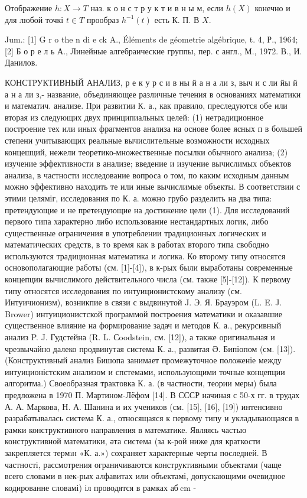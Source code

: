 \documentclass[10pt]{article}
\begin{document}
Отображение $h: X \rightarrow T$ наз. к о н с т р у к т и в н ы м, если $h(X)$ конечно и для любой точкі $t \in T$ прообраз $h^{-1}(t)$ есть К. П. В $X$.



Jum.: [1] G r o the n di e ck A., Éléments de géometrie algébrique, t. 4, Р., 1964; [2] Б о р е л ь А., Линейные алгебраические группы, пер. с англ., М., 1972. В., И. Данилов.



КОНСТРУКТИВНЫЙ АНАЛИЗ, р е к у р с и в ны й а н а ли з, выч и с ли йы й а н а ли з,- название, объединяющее различные течения в основаниях математики и математич. анализе. При развитии К. а., как правило, преследуются обе или вторая из следующих двух принципиальных целей: (1) нетрадиционное построение тех или иных фрагментов анализа на основе более ясных п в большей степени учитывающих реальные вычислительные возможности исходных концешций, нежели теоретико-множественные посылки обычного анализа; (2) изучение эффективности в анализе; введение и изучение вычислимых объектов анализа, в частности исследование вопроса о том, по каким исходным данным можно эффективно находить те или иные вычислимые объекты. В соответствии с этими целяміг, исследования по К. а. можно грубо разделить на два типа: претендующие и не претендующие на достижение цели (1). Для исследований первого типа характерно либо использование нестандартных логик, либо существенные ограничения в употреблении традиционных логических и математических средств, в то время как в работах второго типа свободно используются традиционная математика и логика. Ко второму типу относятся основополагающие работы (см. [1]-[4]), в к-рых были выработаны современные концепции вычислимого действительного числа (см. также [5]-[12]). К первому типу относятся исследования по интуиционистскому анализу (см. Интуичионизм), возникпие в связи с выдвинутой J. Э. Я. Брауэром (L. E. J. Brower) интуиционистской программой построения математики и оказавшие существенное влияние на формирование задач и методов К. а., рекурсивный анализ P. J. Гудстейна (R. L. Сoodstein, см. [12]), а также оригинальная и чрезвычайно далеко продвинутая система $К$. а., развитая Ә. Бипіопом (см. [13]). (Конструктивный анализ Бишопа занимает промежуточное положеніе между интуиционістским анализом и спстемами, использующими точные концепции алгоритма.) Своеобразная трактовка К. а. (в частности, теории меры) была предложена в 1970 П. Мартином-Лёфом [14]. В СССР начиная с 50-х гг. в трудах А. А. Маркова, Н. А. Шанина и их учеников (см. [15], [16], [19]) интенсивно разрабатывалась система К. а., относящаяся к первому типу и укладывающаяся в рамки конструктивного направления в математике. Являясь частью конструктивной математики, әта система (за к-рой ниже для краткости закрепляется термıн «К. а.») сохраняет характерные черты последней. В частності, рассмотрения ограничиваются конструктивными объектами (чаще всего словами в нек-рых алфавитах или объектамі, допускающими очевидное кодированне словамі) іл проводятся в рамках $а б \mathrm{~cm}$ -
\end{document}
